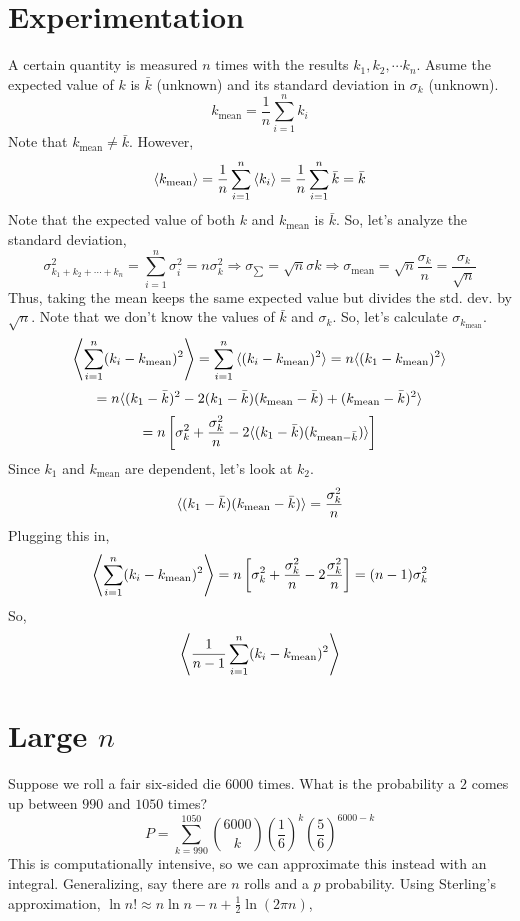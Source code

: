 \documentclass[../main.tex]{subfiles}
\begin{document}
\section{Experimentation}
A certain quantity is measured $n$ times with the results $k_1 , k_2 , \cdots k_n$.
Asume the expected value of $k$ is $\bar{k}$ (unknown) and its standard deviation in $\sigma_{k}$ (unknown).
$$k_{\text{mean}}=\frac{1}{n}\sum_{i=1}^{n}k_{i}$$
Note that $k_{\text{mean}}\neq \bar{k}$. However,
$${\langle k_{\text{mean}} \rangle}=\frac{1}{n}\sum_{i=1}^{n}{\langle k_{i} \rangle}=\frac{1}{n}\sum_{i=1}^{n}\bar{k}=\bar{k}$$
Note that the expected value of both $k$ and $k_{\text{mean}}$ is $\bar{k}$. So, let's analyze the standard deviation,
$$\sigma_{k_1 + k_2 + \cdots + k_n}^{2}=\sum_{i=1}^{n}\sigma_{i}^{2}=n\sigma_{k}^{2}
\Rightarrow \sigma_{\sum}=\sqrt{n}\sigma{k}
\Rightarrow \sigma_{\text{mean}}=\sqrt{n}\frac{\sigma_{k}}{n}=\frac{\sigma_{k}}{\sqrt{n}}
$$
Thus, taking the mean keeps the same expected value but divides the std. dev. by $\sqrt{n}$.
Note that we don't know the values of $\bar{k}$ and $\sigma_{k}$. So, let's calculate $\sigma_{k_{\text{mean}}}$.
$${\left\langle \sum_{i=1}^{n}(k_{i}-k_{\text{mean}})^{2} \right\rangle}=\sum_{i=1}^{n}{\langle (k_{i}-k_{\text{mean}})^{2} \rangle}=n{\langle (k_{1}-k_{\text{mean}})^{2} \rangle}$$
$$=n{\langle 
    (k_{1}-\bar{k})^{2}
    -2(k_{1}-\bar{k})(k_{\text{mean}}-\bar{k})
    +(k_{\text{mean}}-\bar{k})^{2}
     \rangle}$$
$$=n\left[\sigma_{k}^{2}+\frac{\sigma_{k}^{2}}{n}-2{\langle (k_{1}-\bar{k})(k_{\text{mean}-\bar{k}}) \rangle}\right]$$
Since $k_{1}$ and $k_{\text{mean}}$ are dependent, let's look at $k_{2}$.
$${\langle (k_{1}-\bar{k})(k_{\text{mean}}-\bar{k}) \rangle}=\frac{\sigma_{k}^{2}}{n}$$
Plugging this in,
$${\left\langle \sum_{i=1}^{n}(k_{i}-k_{\text{mean}})^{2} \right\rangle}=
n\left[\sigma_{k}^{2}+\frac{\sigma_{k}^{2}}{n}-2\frac{\sigma_{k}^{2}}{n}\right]=(n-1)\sigma_{k}^{2}$$
So,
$${\left\langle \frac{1}{n-1}\sum_{i=1}^{n}(k_{i}-k_{\text{mean}})^{2} \right\rangle}$$

\section{Large $n$}
Suppose we roll a fair six-sided die 6000 times. What is the probability a $2$ comes up between $990$ and $1050$ times?
$$P=\sum_{k=990}^{1050}{6000 \choose k}\left(\frac{1}{6}\right)^{k}\left(\frac{5}{6}\right)^{6000-k}$$
This is computationally intensive, so we can approximate this instead with an integral. Generalizing, say there are $n$ rolls and a $p$
probability. Using Sterling's approximation, $\ln n! \approx n\ln n- n + \frac{1}{2}\ln(2\pi n)$,
\end{document}
